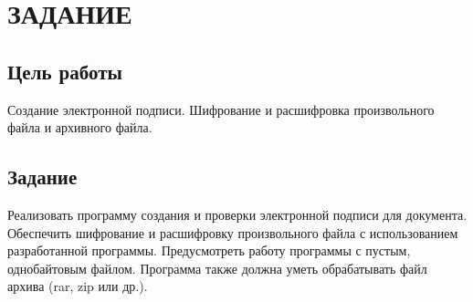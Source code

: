 \chapter*{ЗАДАНИЕ}

\section*{Цель работы}

Создание электронной подписи. Шифрование и расшифровка произвольного файла и архивного файла.

\section*{Задание}

Реализовать программу создания и проверки электронной подписи для документа. Обеспечить шифрование и расшифровку произвольного файла с использованием разработанной программы. Предусмотреть работу программы с пустым, однобайтовым файлом. Программа также должна уметь обрабатывать файл архива (rar, zip или др.).

